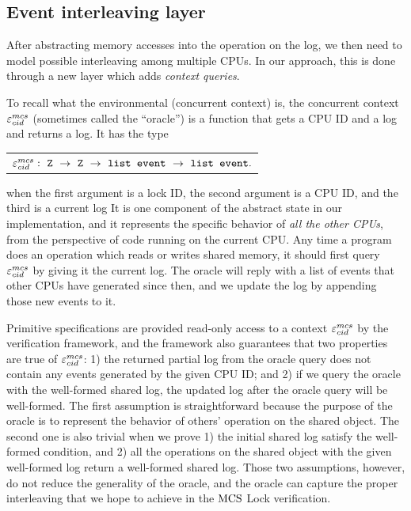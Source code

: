 \subsection{Event interleaving layer}
\label{chapter:mcslock:subsec:abstractoperationlayer}

After abstracting memory accesses into the operation on the log, we
then need to model possible interleaving among multiple CPUs. In
our approach, this is done through a new layer which adds \emph{context queries}.

To recall what the environmental (concurrent context) is,
the concurrent context ${\varepsilon}^{mcs}_{cid}$ (sometimes called the ``oracle'') is
a function that gets  a CPU ID and a log and returns a log.
It has the type\newline
\begin{tabular}{P{0.95\textwidth}}
    $\oracle^{mcs}_{cid}:\  \codeinmath{Z}\ \rightarrow \ \codeinmath{Z}\ \rightarrow\ \codeinmath{list event}\ \rightarrow\ \codeinmath{list event}.$\\
\end{tabular}\newline
when the first argument is a lock ID, the second argument is a CPU ID, and the third is a current log 
It is one component of the abstract state in our implementation, and it represents the specific behavior of \emph{all
the other CPUs}, from the perspective of code running on the current
CPU.  Any time a program does an operation which reads or writes
shared memory, it should first query ${\varepsilon}^{mcs}_{cid}$ by giving it the
current log. The oracle will reply with a list of events that other
CPUs have generated since then, and we update the log by appending
those new events to it.

Primitive specifications are provided read-only access to a context
${\varepsilon}^{mcs}_{cid}$ by the verification framework, and the framework also
guarantees that two properties are true of ${\varepsilon}^{mcs}_{cid}$: 1) the returned
partial log from the oracle query does not contain any events
generated by the given CPU ID; and 2) if we query the oracle with the
well-formed shared log, the updated log after the oracle query will
be well-formed.
The first assumption is straightforward because the purpose of the oracle is to represent the behavior of others' operation on the shared object.
The second one is also trivial when we prove 1) the initial shared log satisfy the well-formed condition, and 2) all the operations on the shared object with the given well-formed log return a well-formed shared log.
Those two assumptions, however, do not reduce the generality of the oracle, and the oracle can capture the proper interleaving that we hope to achieve in the $\mathrm{MCS}$ Lock verification.

